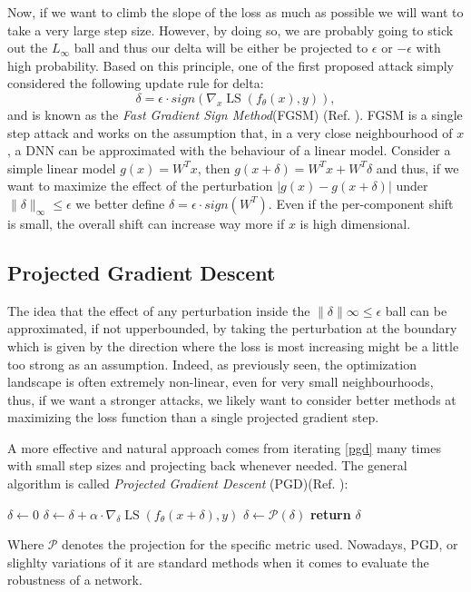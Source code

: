 \documentclass[LaM,binding=0.6cm]{./packages/sapthesis/sapthesis}
\begin{document}
        Now, if we want to climb the slope of the loss as much as possible we will want to take a very large step size. However, by doing so, we are probably going to stick out the $L_{\infty}$ ball
        and thus our delta will be either be projected to $\epsilon$ or $- \epsilon$ with high probability. Based on this principle, one of the first proposed attack simply considered the following update rule 
        for delta:
        \begin{equation}
            \delta = \epsilon \cdot sign(\nabla_{x} \operatorname{LS}\left(f_{\theta}(x), y\right)),
        \end{equation}
        and is known as the \textit{Fast Gradient Sign Method}(FGSM) (Ref. ). FGSM is a single step attack and works on the assumption that, in a very close neighbourhood of $x$, a DNN can be approximated with the 
        behaviour of a linear model. Consider a simple linear model $ g(x)  = W^Tx $, then $g(x + \delta) = W^Tx + W^T\delta $ and thus, if we want to maximize the effect of the perturbation 
        $ |g(x) - g(x + \delta) | $ under $\|\delta\|_{\infty} \leq \epsilon$ we better define $\delta = \epsilon \cdot sign (W^T)$. Even if the per-component shift is small, the overall shift 
        can increase way more if $x$ is high dimensional.
        
    \subsection{Projected Gradient Descent}
    
        The idea that the effect of any perturbation inside the $\|\delta\|\infty \leq \epsilon$ ball can be approximated, if not upperbounded, by taking the perturbation at the boundary which
        is given by the direction where the loss is most increasing might be a little too strong as an assumption. Indeed, as previously seen, the optimization landscape is often extremely
        non-linear, even for very small neighbourhoods, thus, if we want a stronger attacks, we likely want to consider better methods at maximizing the loss function than a single projected gradient step.

        A more effective and natural approach comes from iterating \ref{pgd} many times with small step sizes and projecting back whenever needed. The general algorithm is called \textit{Projected Gradient
        Descent} (PGD)(Ref. ):


            \begin{algorithmic}[0]
            \State $\delta \gets 0$
            \State $\delta \gets \delta + \alpha \cdot \nabla_{\delta} \operatorname{LS}\left(f_{\theta}(x+\delta), y\right)$
            \State $\delta \gets \mathcal{P}(\delta) $
            \EndFor
            \State \textbf{return} $\delta$
            \EndProcedure
            \end{algorithmic}
        Where $\mathcal{P}$ denotes the projection for the specific metric used. Nowadays, PGD, or slighlty variations of it are standard methods when 
        it comes to evaluate the robustness of a network.
\end{document}
